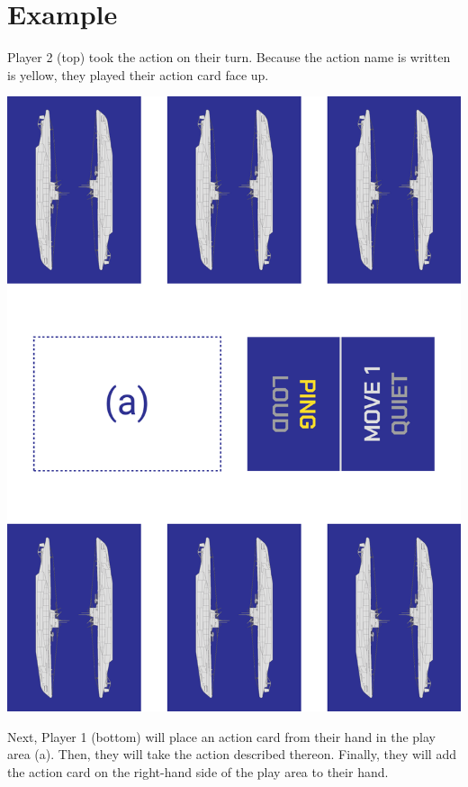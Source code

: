 \section*{Example}
Player 2 (top) took the \PPING{} action on their turn.
Because the action name is written is yellow, they played their action card face up.

\vspace{-1ex}

\begin{center}
\includegraphics[width=0.5\linewidth]{example_diagram.pdf}
\end{center}

\vspace{-1ex}

Next, Player 1 (bottom) will place an action card from their hand in the play area (a).
Then, they will take the action described thereon.
Finally, they will add the action card on the right-hand side of the play area to their hand.
